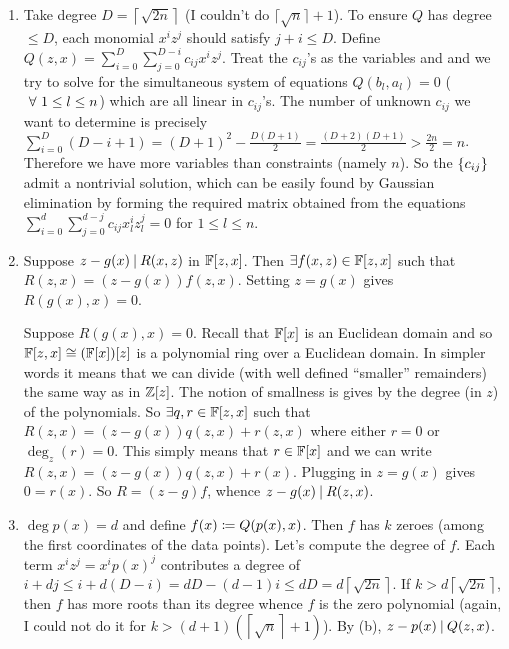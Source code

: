 \begin{enumerate}[leftmargin=*, label=(\alph*)]
\item Take degree $D=\left\lceil\sqrt{2 n}\right\rceil$ {\color{red}(I couldn't do $\lceil\sqrt n\rceil+1$)}. To ensure $Q$ has degree $\le D$, each monomial $x^{i}z^{j}$ should satisfy $j+i \le D$. Define $Q(z,x) = \sum\limits_{i=0}^{D}\sum\limits_{j=0}^{D-i} c_{ij}x^{i}z^{j}$. Treat the $c_{ij}$'s as the variables and and we try to solve for the simultaneous system of equations $Q(b_{l},a_{l}) = 0$ ($~\forall~1\le l\le n$) which are all linear in $c_{ij}$'s. The number of unknown $c_{ij}$ we want to determine is precisely $\sum\limits_{i=0}^{D}(D-i+1) = (D+1)^{2}-\frac{D(D+1)}{2} = \frac{(D+2)(D+1)}{2} > \frac{2n}{2} = n$. Therefore we have more variables than constraints (namely $n$). So the $\left\{c_{ij}\right\}$ admit a nontrivial solution, which can be easily found by Gaussian elimination by forming the required matrix obtained from the equations $\sum\limits_{i=0}^{d}\sum\limits_{j=0}^{d-j} c_{ij}x_{l}^{i}z_{l}^{j} = 0$ for $1\le l\le n$.

\item Suppose $z-g(x)\mathbin{|} R(x,z)$ in $\mathbb{F}[z,x]$. Then $\exists f(x,z)\in \mathbb{F}[z,x]$ such that $R(z,x) = (z-g(x))f(z,x)$. Setting $z=g(x)$ gives $R(g(x),x) =0$.  

Suppose $R(g(x),x) = 0$. Recall that $\mathbb{F}[x]$ is an Euclidean domain and so $\mathbb{F}[z,x]\cong (\mathbb{F}[x])[z]$ is a polynomial ring over a Euclidean domain. In simpler words it means that we can divide (with well defined ``smaller'' remainders) the same way as in $\mathbb{Z}[z]$. The notion of smallness is gives by the degree (in $z$) of the polynomials. So $\exists q,r\in \mathbb{F}[z,x]$ such that $R(z,x) = (z-g(x))q(z,x) + r(z,x)$ where either $r=0$ or $\deg_{z}(r) = 0$. This simply means that $r\in \mathbb{F}[x]$ and we can write $R(z,x) = (z-g(x))q(z,x) + r(x)$. Plugging in $z=g(x)$ gives $0=r(x)$. So $R = (z-g)f$, whence $z-g(x) \mathbin{|} R(z,x)$.
\item $\deg p(x)=d$ and define $f(x)\coloneqq Q(p(x),x)$. Then $f$ has $k$ zeroes (among the first coordinates of the data points). Let's compute the degree of $f$. Each term $x^{i}z^{j}=x^{i}p(x)^{j}$ contributes a degree of $i+dj \le i+d(D-i) = dD - (d-1)i \le dD = d\left\lceil\sqrt{2 n}\right\rceil$. If $k>d\left\lceil\sqrt{2 n}\right\rceil$, then $f$ has more roots than its degree whence $f$ is the zero polynomial {\color{red}(again, I could not do it for $k>(d+1)\left(\left\lceil\sqrt n\right\rceil+1\right)$)}. By (b), $z-p(x) \mathbin{|} Q(z,x)$.
\end{enumerate}










